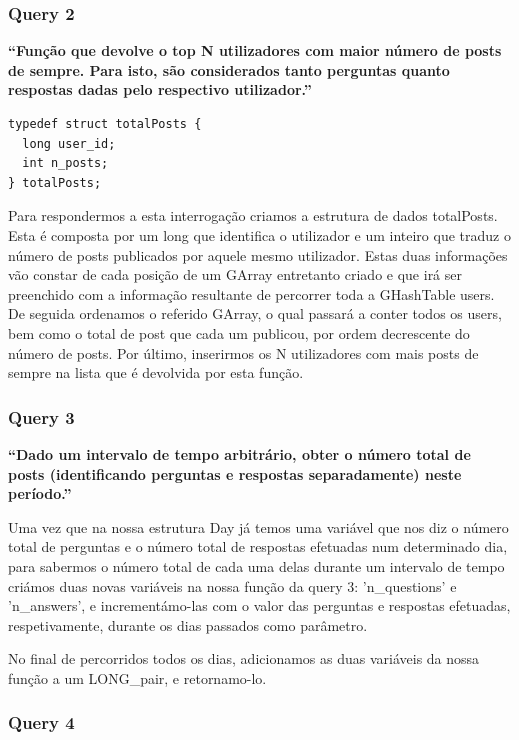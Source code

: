 \documentclass[a4paper]{article}
\begin{document}
\subsubsection*{Query 2}
\label{sec:query2}

\textbf{“Função que devolve o top N utilizadores com maior número
de posts de sempre. Para isto, são considerados tanto perguntas
quanto respostas dadas pelo respectivo utilizador.”}

\begin{verbatim}
typedef struct totalPosts {
  long user_id;
  int n_posts;
} totalPosts;
\end{verbatim}

Para respondermos a esta interrogação criamos a estrutura de dados
totalPosts. Esta é composta por um long que identifica o utilizador e um inteiro
que traduz o número de posts publicados por aquele mesmo utilizador.
Estas duas informações vão constar de cada posição de um GArray entretanto criado
e que irá ser preenchido com a informação resultante de percorrer toda a GHashTable users.
De seguida ordenamos o referido GArray, o qual passará a conter todos os users,
bem como o total de post que cada um publicou, por ordem decrescente do número de posts.
Por último, inserirmos os N utilizadores com
mais posts de sempre na lista que é devolvida por esta função.

\subsubsection*{Query 3}
\label{sec:query3}

\textbf{“Dado um intervalo de tempo arbitrário,
obter o número total de posts (identificando perguntas e respostas separadamente) neste período.”}

Uma vez que na nossa estrutura Day já temos uma variável que nos diz o número total de perguntas
e o número total de respostas efetuadas num determinado dia, para sabermos o
número total de cada uma delas durante um intervalo de tempo criámos duas novas
variáveis na nossa função da query 3: \textsf{'n\_questions'} e \textsf{'n\_answers'},
e incrementámo-las com o valor das perguntas e respostas efetuadas, respetivamente,
durante os dias passados como parâmetro.

No final de percorridos todos os dias, adicionamos as duas variáveis da nossa função a um LONG\_pair, e retornamo-lo.


\subsubsection*{Query 4}
\label{sec:query4}
\end{document}
